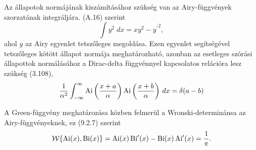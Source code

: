 Az állapotok normájának kiszámításához szükség van az Airy-függvények szorzatának integráljára. \cite{Albright_1977} (A.16) szerint
\begin{equation}
	\int y^2\;dx = xy^2 - {y^\prime}^2,
	\label{airy:normintegral}
\end{equation}
ahol $y$ az Airy egyenlet tetszőleges megoldása. Ezen egyenlet segítségével tetszőleges kötött állapot normája meghatározható, azonban az esetleges szórási állapottok normálásához a Dirac-delta függvénnyel kapcsolatos relációra lesz szükség \cite{Vallee:2010:AFA} (3.108),
\begin{equation}
	\frac{1}{\alpha^2}\int_{-\infty}^\infty\operatorname{Ai}\left(\frac{x+a}{\alpha}\right)\operatorname{Ai}\left(\frac{x+b}{\alpha}\right)\,dx=\delta(a-b)
	\label{airy:delta}
\end{equation}

A Green-függvény meghatározása közben felmerül a Wronski-determinánsa az Airy-függvényeknek, ez \cite{NIST:DLMF} (9.2.7) szerint
\begin{equation}
	\mathcal{W} \{ \operatorname{Ai}(x), \operatorname{Bi}(x) \} = \operatorname{Ai}(x)\operatorname{Bi^\prime}(x) - \operatorname{Bi}(x)\operatorname{Ai^\prime}(x) = \frac{1}{\pi}.
	\label{airy:wronski}
\end{equation}








